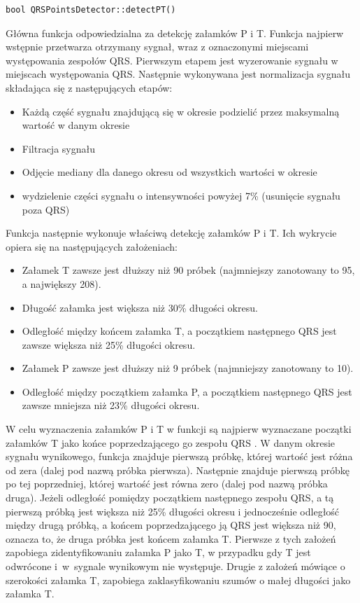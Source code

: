 \documentclass[a4paper, 11pt]{article}
\begin{document}
\begin{lstlisting}
bool QRSPointsDetector::detectPT()
\end{lstlisting}

Główna funkcja odpowiedzialna za detekcję załamków P i T. Funkcja najpierw wstępnie przetwarza
otrzymany sygnał, wraz z oznaczonymi miejscami występowania zespołów QRS. Pierwszym etapem jest
wyzerowanie sygnału w miejscach występowania QRS. Następnie wykonywana jest normalizacja sygnału
składająca się z następujących etapów:
\begin{itemize}
     \item Każdą część sygnału znajdującą się w okresie podzielić przez maksymalną wartość w danym okresie
     \item Filtracja sygnału
     \item Odjęcie mediany dla danego okresu od wszystkich wartości w okresie
     \item wydzielenie części sygnału o intensywności powyżej 7\% (usunięcie sygnału poza
QRS)
\end{itemize}

Funkcja następnie wykonuje właściwą detekcję załamków P i T. Ich wykrycie opiera się na następujących
założeniach:
\begin{itemize}
     \item Załamek T zawsze jest dłuższy niż 90 próbek (najmniejszy zanotowany to 95, a
największy 208).
     \item Długość załamka jest większa niż 30\% długości okresu.
     \item Odległość między końcem załamka T, a początkiem następnego QRS jest zawsze
większa niż 25\% długości okresu.
     \item Załamek P zawsze jest dłuższy niż 9 próbek (najmniejszy zanotowany to 10).
     \item Odległość między początkiem załamka P, a początkiem następnego QRS jest
zawsze mniejsza niż 23\% długości okresu.
\end{itemize}

W celu wyznaczenia załamków P i T w funkcji są najpierw wyznaczane początki załamków T jako
końce poprzedzającego go zespołu QRS . W danym okresie sygnału wynikowego, funkcja znajduje
pierwszą próbkę, której wartość jest różna od zera (dalej pod nazwą próbka pierwsza). Następnie
znajduje pierwszą próbkę po tej poprzedniej, której wartość jest równa zero (dalej pod nazwą próbka
druga). Jeżeli odległość pomiędzy początkiem następnego zespołu QRS, a tą pierwszą próbką
jest większa niż 25\% długości okresu i jednocześnie odległość między drugą próbką, a końcem
poprzedzającego ją QRS jest większa niż 90, oznacza to, że druga próbka jest końcem załamka T.
Pierwsze z tych założeń zapobiega zidentyfikowaniu załamka P jako T, w przypadku gdy T jest
odwrócone i~w~sygnale wynikowym nie występuje. Drugie z założeń mówiące o szerokości załamka
T, zapobiega zaklasyfikowaniu szumów o małej długości jako załamka T.
\end{document}
